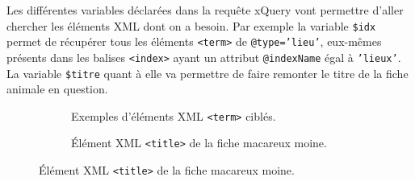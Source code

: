 \documentclass[a4paper,12pt,twoside]{book}
\begin{document}
    Les différentes variables déclarées dans la requête xQuery vont permettre d'aller chercher les éléments XML dont on a besoin. Par exemple la variable \texttt{\$idx} permet de récupérer tous les éléments \texttt{<term>} de \texttt{@type='lieu'}, eux-mêmes présents dans les balises \texttt{<index>} ayant un attribut \texttt{@indexName} égal à \texttt{'lieux'}. La variable \texttt{\$titre} quant à elle va permettre de faire remonter le titre de la fiche animale en question.
    
    
    \begin{figure}[H]
  \centering
  \begin{subfigure}[b]{0.3\linewidth}
    \caption{Exemples d'éléments XML \texttt{<term>} ciblés.}
  \end{subfigure}
  \begin{subfigure}[b]{0.4\linewidth}
    \caption{Élément XML \texttt{<title>} de la fiche macareux moine.}
  \end{subfigure}
\end{figure}
\end{document}
